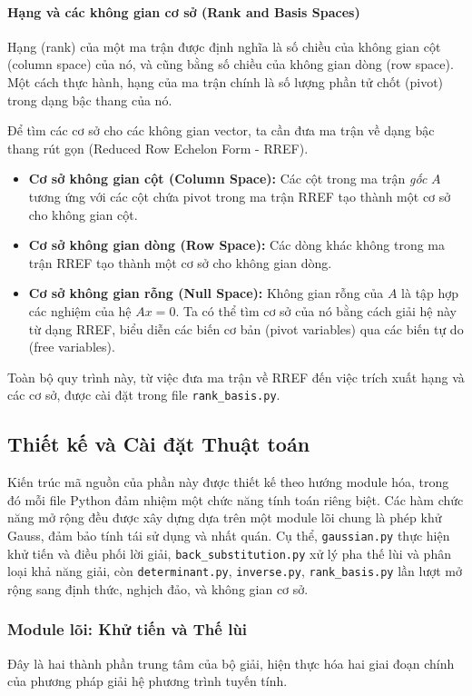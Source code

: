 \paragraph{Hạng và các không gian cơ sở (Rank and Basis Spaces)}
Hạng (rank) của một ma trận được định nghĩa là số chiều của không gian cột (column space) của nó, và cũng bằng số chiều của không gian dòng (row space). Một cách thực hành, hạng của ma trận chính là số lượng phần tử chốt (pivot) trong dạng bậc thang của nó.

Để tìm các cơ sở cho các không gian vector, ta cần đưa ma trận về dạng bậc thang rút gọn (Reduced Row Echelon Form - RREF).
\begin{itemize}
    \item \textbf{Cơ sở không gian cột (Column Space):} Các cột trong ma trận \textit{gốc} $A$ tương ứng với các cột chứa pivot trong ma trận RREF tạo thành một cơ sở cho không gian cột.
    \item \textbf{Cơ sở không gian dòng (Row Space):} Các dòng khác không trong ma trận RREF tạo thành một cơ sở cho không gian dòng.
    \item \textbf{Cơ sở không gian rỗng (Null Space):} Không gian rỗng của $A$ là tập hợp các nghiệm của hệ $Ax=0$. Ta có thể tìm cơ sở của nó bằng cách giải hệ này từ dạng RREF, biểu diễn các biến cơ bản (pivot variables) qua các biến tự do (free variables).
\end{itemize}
Toàn bộ quy trình này, từ việc đưa ma trận về RREF đến việc trích xuất hạng và các cơ sở, được cài đặt trong file \texttt{rank\_basis.py}.


\subsection{Thiết kế và Cài đặt Thuật toán}
\label{sec:implementation_design}
Kiến trúc mã nguồn của phần này được thiết kế theo hướng module hóa, trong đó mỗi file Python đảm nhiệm một chức năng tính toán riêng biệt. Các hàm chức năng mở rộng đều được xây dựng dựa trên một module lõi chung là phép khử Gauss, đảm bảo tính tái sử dụng và nhất quán. Cụ thể, \texttt{gaussian.py} thực hiện khử tiến và điều phối lời giải, \texttt{back\_substitution.py} xử lý pha thế lùi và phân loại khả năng giải, còn \texttt{determinant.py}, \texttt{inverse.py}, \texttt{rank\_basis.py} lần lượt mở rộng sang định thức, nghịch đảo, và không gian cơ sở.

\subsubsection{Module lõi: Khử tiến và Thế lùi}
\label{sec:core_modules}
Đây là hai thành phần trung tâm của bộ giải, hiện thực hóa hai giai đoạn chính của phương pháp giải hệ phương trình tuyến tính.

